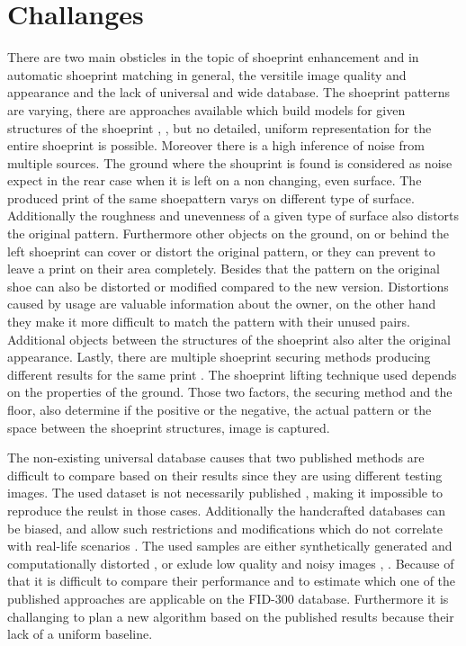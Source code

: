 \documentclass[draft,final]{vutinfth} %
\begin{document}
\section{Challanges}
\par
There are two main obsticles in the topic of shoeprint enhancement and in automatic shoeprint matching in general, the versitile image quality and appearance and the lack of universal and wide database.
The shoeprint patterns are varying, there are approaches available which build models for given structures of the shoeprint \cite{tang2010footwear}, \cite{alizadeh2017automatic}, but no detailed, uniform representation for the entire shoeprint is possible.
Moreover there is a high inference of noise from multiple sources.
The ground where the shouprint is found is considered as noise expect in the rear case when it is left on a non changing, even surface.
The produced print of the same shoepattern varys on different type of surface.
Additionally the roughness and unevenness of a given type of surface also distorts the original pattern.
Furthermore other objects on the ground, on or behind the left shoeprint can cover or distort the original pattern, or they can prevent to leave a print on their area completely.
Besides that the pattern on the original shoe can also be distorted or modified compared to the new version.
Distortions caused by usage are valuable information about the owner, on the other hand they make it more difficult to match the pattern with their unused pairs.
Additional objects between the structures of the shoeprint also alter the original appearance.
Lastly, there are multiple shoeprint securing methods producing different results for the same print \cite{katireddy2017novel}. 
The shoeprint lifting technique used depends on the properties of the ground. 
Those two factors, the securing method and the floor, also determine if the positive or the negative, the actual pattern or the space between the shoeprint structures, image is captured.
\par
The non-existing universal database causes that two published methods are difficult to compare based on their results since they are using different testing images.
The used dataset is not necessarily published \cite{katireddy2017novel}, \cite{dardi2009texture} making it impossible to reproduce the reulst in those cases.
Additionally the handcrafted databases can be biased, and allow such restrictions and modifications which do not correlate with real-life scenarios \cite{rida2019forensic}.
The used samples are either synthetically generated and computationally distorted \cite{de2005automated}, \cite{gueham2008automatic} or exlude low quality and noisy images \cite{dardi2009texture}, \cite{tang2010footwear}.
Because of that it is difficult to compare their performance and to estimate which one of the published approaches are applicable on the FID-300 database.
Furthermore it is challanging to plan a new algorithm based on the published results because their lack of a uniform baseline.
\end{document}
